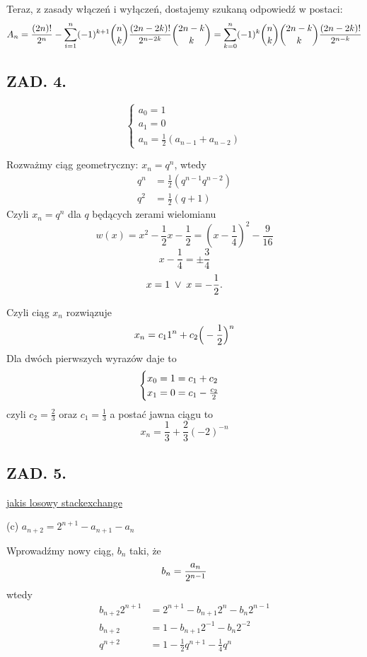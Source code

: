 \documentclass{article}[13pt]
\begin{document}
Teraz, z zasady włączeń i wyłączeń, dostajemy szukaną odpowiedź w postaci:
$$A_{n}={(2n)!\over 2^n}-\sum\limits_{i=1}^n(-1)^{k+1}{n\choose k}{(2n-2k)!\over 2^{n-2k}}{2n-k\choose k}=\sum\limits_{k=0}^n(-1)^k{n\choose k}{2n-k\choose k}{(2n-2k)!\over 2^{n-k}}$$


\subsection*{ZAD. 4.}

$$\begin{cases}
    a_0=1\\
    a_1=0\\
    a_n=\frac12(a_{n-1}+a_{n-2})
\end{cases}$$

Rozważmy ciąg geometryczny: $x_n=q^n$, wtedy
\begin{align*}
    q^n&=\frac12(q^{n-1}q^{n-2})\\
    q^2&=\frac12(q+1)
\end{align*}
Czyli $x_n=q^n$ dla $q$ będących zerami wielomianu
$$w(x)=x^2-\frac12x-\frac12=(x-\frac14)^2-\frac9{16}$$
$$x-\frac14=\pm \frac34$$
$$x=1\;\lor\;x=-{1\over 2}.$$

Czyli ciąg $x_n$ rozwiązuje
$$x_n=c_11^n+c_2\Big(-{1\over 2}\Big)^n$$
Dla dwóch pierwszych wyrazów daje to
\begin{align*}
    \begin{cases}
        x_0=1=c_1+c_2\\
        x_1=0=c_1-{c_2\over2}
    \end{cases}\\
\end{align*}
czyli $c_2=\frac23$ oraz $c_1=\frac13$ a postać jawna ciągu to
$$x_n=\frac13+\frac23(-2)^{-n}$$


\subsection*{ZAD. 5.}

\href{https://math.stackexchange.com/questions/1258484/getting-rid-of-exponents-with-n-when-solving-with-annihilators-a-n-a-n-12a}{jakis losowy stackexchange}

{\color{acc}(c)} $a_{n+2}=2^{n+1}-a_{n+1}-a_n$
\smallskip

Wprowadźmy nowy ciąg, $b_n$ taki, że
$$b_n={a_n\over 2^{n-1}}$$
wtedy
\begin{align*}
    b_{n+2}2^{n+1}&=2^{n+1}-b_{n+1}2^n-b_n2^{n-1}\\
    b_{n+2}&=1-b_{n+1}2^{-1}-b_n2^{-2}\\
    q^{n+2}&=1-\frac12q^{n+1}-\frac14q^{n}
\end{align*}
\end{document}
